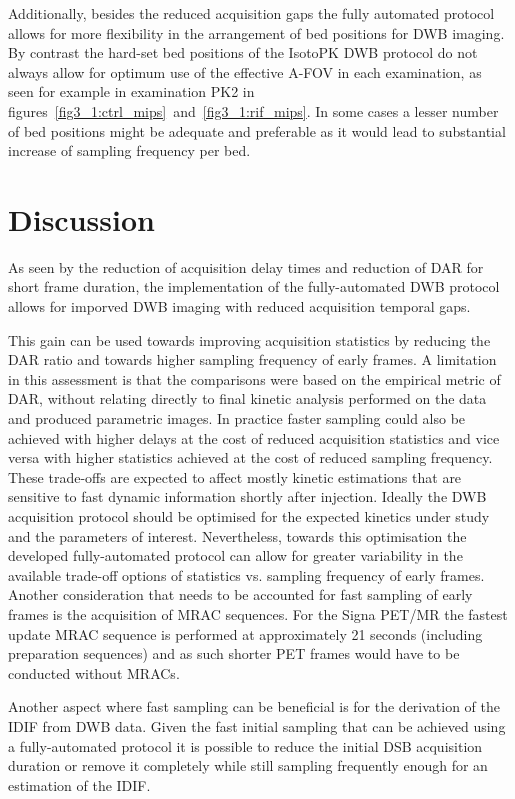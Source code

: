 Additionally, besides the reduced acquisition gaps the fully automated protocol allows for more flexibility in the arrangement of bed positions for DWB imaging. By contrast the hard-set bed positions of the IsotoPK DWB protocol do not always allow for optimum use of the effective A-FOV in each examination, as seen for example in examination PK2 in figures~\ref{fig3_1:ctrl_mips}~and~\ref{fig3_1:rif_mips}. In some cases a lesser number of bed positions might be adequate and preferable as it would lead to substantial increase of sampling frequency per bed.

\section{Discussion}

As seen by the reduction of acquisition delay times and reduction of DAR for short frame duration, the implementation of the fully-automated DWB protocol allows for imporved DWB imaging with reduced acquisition temporal gaps.

This gain can be used towards improving acquisition statistics by reducing the DAR ratio and towards higher sampling frequency of early frames. 
A limitation in this assessment is that the comparisons were based on the empirical metric of DAR, without relating directly to final kinetic analysis performed on the data and produced parametric images. In practice faster sampling could also be achieved with higher delays at the cost of reduced acquisition statistics and vice versa with higher statistics achieved at the cost of reduced sampling frequency. 
These trade-offs are expected to affect mostly kinetic estimations that are sensitive to fast dynamic information shortly after injection. 
Ideally the DWB acquisition protocol should be optimised for the expected kinetics under study and the parameters of interest. Nevertheless, towards this optimisation the developed fully-automated protocol can allow for greater variability in the available trade-off options of statistics vs. sampling frequency of early frames. 
Another consideration that needs to be accounted for fast sampling of early frames is the acquisition of MRAC sequences. For the Signa PET/MR the fastest update MRAC sequence is performed at approximately 21 seconds (including preparation sequences) and as such shorter PET frames would have to be conducted without MRACs.

Another aspect where fast sampling can be beneficial is for the derivation of the IDIF from DWB data. Given the fast initial sampling that can be achieved using a fully-automated protocol it is possible to reduce the initial DSB acquisition duration or remove it completely while still sampling frequently enough for an estimation of the IDIF.

